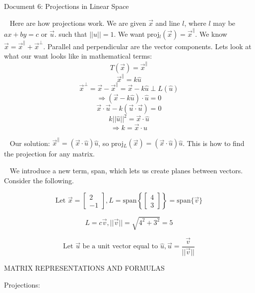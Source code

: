 \documentclass[11pt]{article}
\begin{document}
\begin{center}
Document 6: Projections in Linear Space
\end{center}

\setlength{\leftskip}{0 in}
$\,\,\,$ Here are how projections work. We are given $\vec{x}$ and line $l$, where $l$ may be $ax+by=c$ or $\vec{u}$. such that $||u||=1$. We want proj$_l(\vec{x})=\vec{x}^{\parallel}$. We know $\vec{x}=\vec{x}^{\parallel}+\vec{x}^{\perp}$. Parallel and perpendicular are the vector components. Lets look at what our want looks like in mathematical terms:
$$T(\vec{x})=\vec{x}^{\parallel}$$
$$\vec{x}^{\parallel}=k\hat{u}$$
$$\vec{x}^{\perp}=\vec{x}-\vec{x}^{\parallel}=\vec{x}-k\hat{u}\perp L(\hat{u})$$
$$\Rightarrow (\vec{x}-k\hat{u})\cdot\hat{u}=0$$
$$\vec{x}\cdot\vec{u}-k(\vec{u}\cdot\vec{u})=0$$
$$k||\hat{u}||^2=\vec{x}\cdot\hat{u}$$
$$\Rightarrow k=\vec{x}\cdot\hat{u}$$

$\,\,\,$ Our solution: $\vec{x}^{\parallel}=(\vec{x}\cdot\hat{u})\hat{u}$, so proj$_L(\vec{x})=(\vec{x}\cdot\hat{u})\hat{u}$. This is how to find the projection for any matrix.

$\,\,\,$ We introduce a new term, span, which lets us create planes between vectors. Consider the following.

$$\text{Let }\vec{x}=\begin{bmatrix}2\\-1\end{bmatrix},L=\text{span}\left\lbrace\begin{bmatrix}4\\3\end{bmatrix}\right\rbrace=\text{span}\lbrace \vec{v}\rbrace$$

$$L=c\vec{v},||\vec{v}||=\sqrt{4^2+3^2}=5$$

$$\text{Let }\vec{u} \text{ be a unit vector equal to }\hat{u},\vec{u}=\frac{\vec{v}}{||\vec{v}||}$$

\newpage
\begin{center}
MATRIX REPRESENTATIONS AND FORMULAS
\end{center}

Projections:
\end{document}

